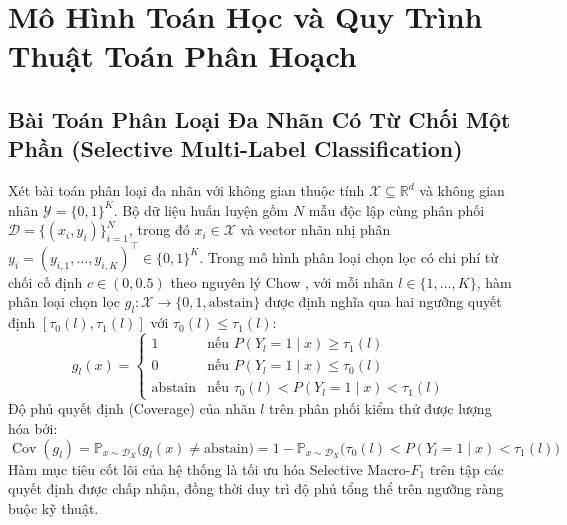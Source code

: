 \documentclass[10pt,a4paper]{article}
\begin{document}
\section{Mô Hình Toán Học và Quy Trình Thuật Toán Phân Hoạch}

\subsection{Bài Toán Phân Loại Đa Nhãn Có Từ Chối Một Phần (Selective Multi-Label Classification)}
Xét bài toán phân loại đa nhãn với không gian thuộc tính $\mathcal{X} \subseteq \mathbb{R}^d$ và không gian nhãn $\mathcal{Y} = \{0, 1\}^K$. Bộ dữ liệu huấn luyện gồm $N$ mẫu độc lập cùng phân phối $\mathcal{D} = \{(x_i, y_i)\}_{i=1}^N$, trong đó $x_i \in \mathcal{X}$ và vector nhãn nhị phân $y_i = (y_{i, 1}, \dots, y_{i, K})^\top \in \{0, 1\}^K$. Trong mô hình phân loại chọn lọc có chi phí từ chối cố định $c \in (0, 0.5)$ theo nguyên lý Chow \cite{chow1970}, với mỗi nhãn $l \in \{1, \dots, K\}$, hàm phân loại chọn lọc $g_l: \mathcal{X} \to \{0, 1, \text{abstain}\}$ được định nghĩa qua hai ngưỡng quyết định $[\tau_0(l), \tau_1(l)]$ với $\tau_0(l) \le \tau_1(l)$:
\begin{equation}
    g_l(x) = \begin{cases}
        1 & \text{nếu } P(Y_l = 1 \mid x) \ge \tau_1(l) \\
        0 & \text{nếu } P(Y_l = 1 \mid x) \le \tau_0(l) \\
        \text{abstain} & \text{nếu } \tau_0(l) < P(Y_l = 1 \mid x) < \tau_1(l)
    \end{cases}
\end{equation}
Độ phủ quyết định (Coverage) của nhãn $l$ trên phân phối kiểm thử được lượng hóa bởi:
\begin{equation}
    \operatorname{Cov}(g_l) = \mathbb{P}_{x \sim \mathcal{D}_X}\big(g_l(x) \neq \text{abstain}\big) = 1 - \mathbb{P}_{x \sim \mathcal{D}_X}\big(\tau_0(l) < P(Y_l = 1 \mid x) < \tau_1(l)\big)
\end{equation}
Hàm mục tiêu cốt lõi của hệ thống là tối ưu hóa Selective Macro-$F_1$ trên tập các quyết định được chấp nhận, đồng thời duy trì độ phủ tổng thể trên ngưỡng ràng buộc kỹ thuật.
\end{document}
